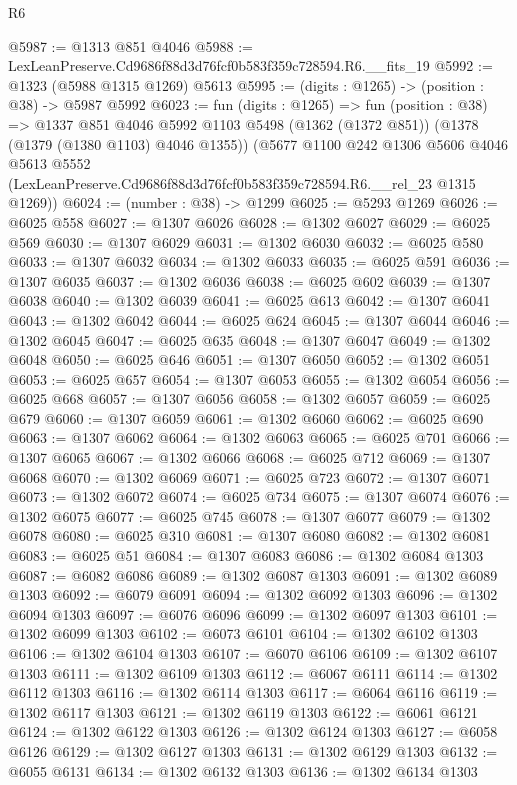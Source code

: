 \begin{lexlean}{R6}
\begin{coremodule}
@5987 := @1313 @851 @4046
@5988 := LexLeanPreserve.Cd9686f88d3d76fcf0b583f359c728594.R6.__fits_19
@5992 := @1323 (@5988 @1315 @1269) @5613
@5995 := (digits : @1265) -> (position : @38) -> @5987 @5992
@6023 := fun (digits : @1265) =>
  fun (position : @38) =>
  @1337
    @851
    @4046
    @5992
    @1103
    @5498
    (@1362 (@1372 @851))
    (@1378 (@1379 (@1380 @1103) @4046 @1355))
    (@5677
      @1100
      @242
      @1306
      @5606
      @4046
      @5613
      @5552
      (LexLeanPreserve.Cd9686f88d3d76fcf0b583f359c728594.R6.__rel_23 @1315 @1269))
@6024 := (number : @38) -> @1299
@6025 := @5293 @1269
@6026 := @6025 @558
@6027 := @1307 @6026
@6028 := @1302 @6027
@6029 := @6025 @569
@6030 := @1307 @6029
@6031 := @1302 @6030
@6032 := @6025 @580
@6033 := @1307 @6032
@6034 := @1302 @6033
@6035 := @6025 @591
@6036 := @1307 @6035
@6037 := @1302 @6036
@6038 := @6025 @602
@6039 := @1307 @6038
@6040 := @1302 @6039
@6041 := @6025 @613
@6042 := @1307 @6041
@6043 := @1302 @6042
@6044 := @6025 @624
@6045 := @1307 @6044
@6046 := @1302 @6045
@6047 := @6025 @635
@6048 := @1307 @6047
@6049 := @1302 @6048
@6050 := @6025 @646
@6051 := @1307 @6050
@6052 := @1302 @6051
@6053 := @6025 @657
@6054 := @1307 @6053
@6055 := @1302 @6054
@6056 := @6025 @668
@6057 := @1307 @6056
@6058 := @1302 @6057
@6059 := @6025 @679
@6060 := @1307 @6059
@6061 := @1302 @6060
@6062 := @6025 @690
@6063 := @1307 @6062
@6064 := @1302 @6063
@6065 := @6025 @701
@6066 := @1307 @6065
@6067 := @1302 @6066
@6068 := @6025 @712
@6069 := @1307 @6068
@6070 := @1302 @6069
@6071 := @6025 @723
@6072 := @1307 @6071
@6073 := @1302 @6072
@6074 := @6025 @734
@6075 := @1307 @6074
@6076 := @1302 @6075
@6077 := @6025 @745
@6078 := @1307 @6077
@6079 := @1302 @6078
@6080 := @6025 @310
@6081 := @1307 @6080
@6082 := @1302 @6081
@6083 := @6025 @51
@6084 := @1307 @6083
@6086 := @1302 @6084 @1303
@6087 := @6082 @6086
@6089 := @1302 @6087 @1303
@6091 := @1302 @6089 @1303
@6092 := @6079 @6091
@6094 := @1302 @6092 @1303
@6096 := @1302 @6094 @1303
@6097 := @6076 @6096
@6099 := @1302 @6097 @1303
@6101 := @1302 @6099 @1303
@6102 := @6073 @6101
@6104 := @1302 @6102 @1303
@6106 := @1302 @6104 @1303
@6107 := @6070 @6106
@6109 := @1302 @6107 @1303
@6111 := @1302 @6109 @1303
@6112 := @6067 @6111
@6114 := @1302 @6112 @1303
@6116 := @1302 @6114 @1303
@6117 := @6064 @6116
@6119 := @1302 @6117 @1303
@6121 := @1302 @6119 @1303
@6122 := @6061 @6121
@6124 := @1302 @6122 @1303
@6126 := @1302 @6124 @1303
@6127 := @6058 @6126
@6129 := @1302 @6127 @1303
@6131 := @1302 @6129 @1303
@6132 := @6055 @6131
@6134 := @1302 @6132 @1303
@6136 := @1302 @6134 @1303

\end{coremodule}
\end{lexlean}
